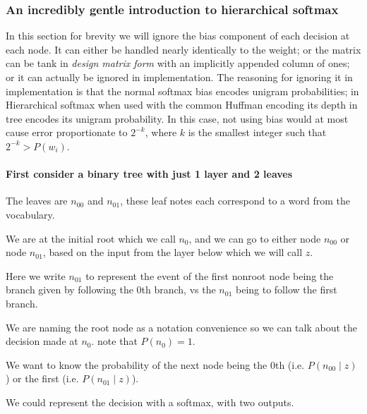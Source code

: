\documentclass[parskip]{komatufte}
\begin{document}
\subsubsection{An incredibly gentle introduction to hierarchical softmax}

In this section for brevity we will ignore the bias component of each decision at each node.
It can either be handled nearly identically to the weight;
or the matrix can be tank in \emph{design matrix form} with an implicitly appended column of ones;
or it can actually be ignored in implementation.
The reasoning for ignoring it in implementation is that the normal softmax bias encodes unigram probabilities;
in Hierarchical softmax when used with the common Huffman encoding its depth in tree encodes its unigram probability. In this case, not using bias would at most cause error proportionate to $2^{-k}$, where $k$ is the smallest integer such that $2^{-k}>P(w_i)$.


\paragraph{First consider a binary tree with just 1 layer and 2 leaves}
The leaves are $n_{00}$ and $n_{01}$, these leaf notes each correspond to a word from the vocabulary.


	
We are at the initial root which we call $n_{0}$, and we can go to
either node $n_{00}$ or node $n_{01}$, based on the input from the
layer below which we will call $z$.

Here we write $n_{01}$ to represent the event of the first nonroot
node being the branch given by following the 0th branch, vs the $n_{01}$
being to follow the first branch. 

We are naming the root node as a notation convenience so we can talk
about the decision made at $n_{0}$. note that $P(n_{0})=1$.

We want to know the probability of the next node being the 0th (i.e.
$P(n_{00}\mid z)$ ) or the first (i.e. $P(n_{01}\mid z)$).

We could represent the decision with a softmax, with two outputs.
 
\end{document}

